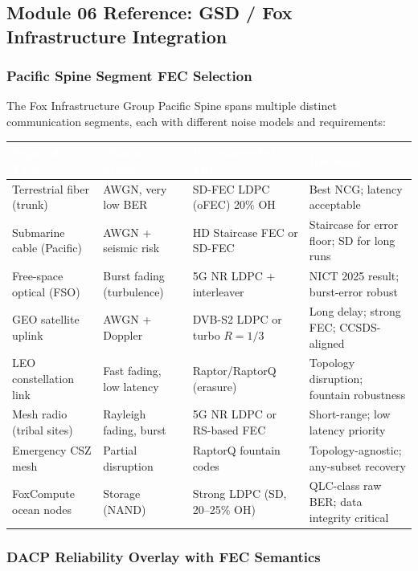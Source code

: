 \documentclass[11pt,letterpaper]{article}
\newcommand{\tableheader}[1]{\textbf{\sffamily\textcolor{white}{#1}}}
\begin{document}
\subsection{Module 06 Reference: GSD / Fox Infrastructure Integration}

\subsubsection{Pacific Spine Segment FEC Selection}

The Fox Infrastructure Group Pacific Spine spans multiple distinct communication segments, each with different noise models and requirements:

\begin{center}
\begin{tabularx}{\textwidth}{L{3.5cm}L{3cm}L{3cm}X}
\toprule
{}
\tableheader{Segment Type} & \tableheader{Channel Model} & \tableheader{Recommended FEC} & \tableheader{Rationale} \\
\midrule
Terrestrial fiber (trunk) & AWGN, very low BER & SD-FEC LDPC (oFEC) 20\% OH & Best NCG; latency acceptable \\
Submarine cable (Pacific) & AWGN + seismic risk & HD Staircase FEC or SD-FEC & Staircase for error floor; SD for long runs \\
Free-space optical (FSO) & Burst fading (turbulence) & 5G NR LDPC + interleaver & NICT 2025 result; burst-error robust \\
GEO satellite uplink & AWGN + Doppler & DVB-S2 LDPC or turbo $R=1/3$ & Long delay; strong FEC; CCSDS-aligned \\
LEO constellation link & Fast fading, low latency & Raptor/RaptorQ (erasure) & Topology disruption; fountain robustness \\
Mesh radio (tribal sites) & Rayleigh fading, burst & 5G NR LDPC or RS-based FEC & Short-range; low latency priority \\
Emergency CSZ mesh & Partial disruption & RaptorQ fountain codes & Topology-agnostic; any-subset recovery \\
FoxCompute ocean nodes & Storage (NAND) & Strong LDPC (SD, 20--25\% OH) & QLC-class raw BER; data integrity critical \\
\bottomrule
\end{tabularx}
\end{center}

\subsubsection{DACP Reliability Overlay with FEC Semantics}
\end{document}
